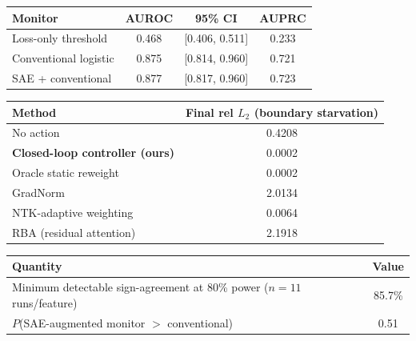 \begin{tabular}{lccc}
\toprule
Monitor & AUROC & 95\% CI & AUPRC \\
\midrule
Loss-only threshold & 0.468 & [0.406, 0.511] & 0.233 \\
Conventional logistic & 0.875 & [0.814, 0.960] & 0.721 \\
SAE + conventional & 0.877 & [0.817, 0.960] & 0.723 \\
\bottomrule
\end{tabular}

\begin{tabular}{lc}
\toprule
Method & Final rel $L_2$ (boundary starvation) \\
\midrule
No action & 0.4208 \\
\textbf{Closed-loop controller (ours)} & 0.0002 \\
Oracle static reweight & 0.0002 \\
GradNorm & 2.0134 \\
NTK-adaptive weighting & 0.0064 \\
RBA (residual attention) & 2.1918 \\
\bottomrule
\end{tabular}

\begin{tabular}{lc}
\toprule
Quantity & Value \\
\midrule
Minimum detectable sign-agreement at 80\% power ($n=11$ runs/feature) & 85.7\% \\
$P$(SAE-augmented monitor $>$ conventional) & 0.51 \\
\bottomrule
\end{tabular}
